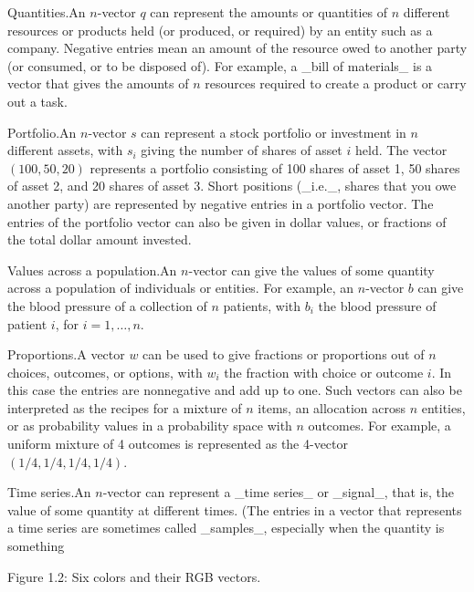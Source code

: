 
Quantities.An \(n\)-vector \(q\) can represent the amounts or quantities of \(n\) different resources or products held (or produced, or required) by an entity such as a company. Negative entries mean an amount of the resource owed to another party (or consumed, or to be disposed of). For example, a _bill of materials_ is a vector that gives the amounts of \(n\) resources required to create a product or carry out a task.

Portfolio.An \(n\)-vector \(s\) can represent a stock portfolio or investment in \(n\) different assets, with \(s_{i}\) giving the number of shares of asset \(i\) held. The vector \((100,50,20)\) represents a portfolio consisting of 100 shares of asset 1, 50 shares of asset 2, and 20 shares of asset 3. Short positions (_i.e._, shares that you owe another party) are represented by negative entries in a portfolio vector. The entries of the portfolio vector can also be given in dollar values, or fractions of the total dollar amount invested.

Values across a population.An \(n\)-vector can give the values of some quantity across a population of individuals or entities. For example, an \(n\)-vector \(b\) can give the blood pressure of a collection of \(n\) patients, with \(b_{i}\) the blood pressure of patient \(i\), for \(i=1,\ldots,n\).

Proportions.A vector \(w\) can be used to give fractions or proportions out of \(n\) choices, outcomes, or options, with \(w_{i}\) the fraction with choice or outcome \(i\). In this case the entries are nonnegative and add up to one. Such vectors can also be interpreted as the recipes for a mixture of \(n\) items, an allocation across \(n\) entities, or as probability values in a probability space with \(n\) outcomes. For example, a uniform mixture of 4 outcomes is represented as the 4-vector \((1/4,1/4,1/4,1/4)\).

Time series.An \(n\)-vector can represent a _time series_ or _signal_, that is, the value of some quantity at different times. (The entries in a vector that represents a time series are sometimes called _samples_, especially when the quantity is something

Figure 1.2: Six colors and their RGB vectors.

 